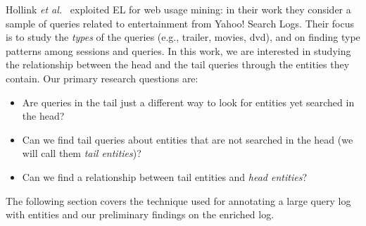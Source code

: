 

Hollink \emph{et al.}~\cite{hollink2013web} exploited EL for web usage mining: 
in their work they consider a sample of queries related to entertainment from 
Yahoo! Search Logs. Their focus is to study the \emph{types} of the queries (e.g., trailer, movies, dvd), and on finding
type patterns among sessions and queries. In this work, we are interested in studying the 
relationship between the head and the tail queries through the entities they contain. 
Our primary research questions are:
\begin{itemize}
	\item Are queries in the tail just a different way to look for entities yet searched in the head? 
	\item Can we find tail queries about entities that are not searched in the head (we will call them \emph{tail entities})?
	\item Can we find a relationship between tail entities and \emph{head entities}?  
\end{itemize} 

The following section covers the technique used for annotating a large query log with entities and our 
preliminary findings on the enriched log.


 
